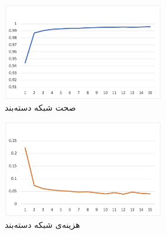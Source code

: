 \begin{multicols}{2}
	\begin{figure}[H]
		\centering
		\includegraphics[width=7cm]{figures/cnn/training/accuracy.png}
		\caption{صحت شبکه دسته‌بند}
		\label{fig:cnn_training_acc}
	\end{figure}
	\columnbreak
	\begin{figure}[H]
		\centering
		\includegraphics[width=7cm]{figures/cnn/training/loss.png}
		\caption {هزینه‌ی شبکه دسته‌بند}
		\label{fig:cnn_training_loss}
	\end{figure}
\end{multicols}

